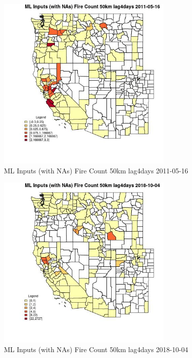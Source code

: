 \begin{figure} 
\centering  
\includegraphics[width=0.77\textwidth]{Code_Outputs/Report_ML_input_PM25_Step4_part_f_de_duplicated_aveswNAs_CountyFire_Count_50km_lag4daysMean2011-05-16.jpg} 
\caption{\label{fig:Report_ML_input_PM25_Step4_part_f_de_duplicated_aveswNAsCountyFire_Count_50km_lag4daysMean2011-05-16}ML Inputs (with NAs) Fire Count 50km lag4days 2011-05-16} 
\end{figure} 
 

\begin{figure} 
\centering  
\includegraphics[width=0.77\textwidth]{Code_Outputs/Report_ML_input_PM25_Step4_part_f_de_duplicated_aveswNAs_CountyFire_Count_50km_lag4daysMean2018-10-04.jpg} 
\caption{\label{fig:Report_ML_input_PM25_Step4_part_f_de_duplicated_aveswNAsCountyFire_Count_50km_lag4daysMean2018-10-04}ML Inputs (with NAs) Fire Count 50km lag4days 2018-10-04} 
\end{figure} 
 

